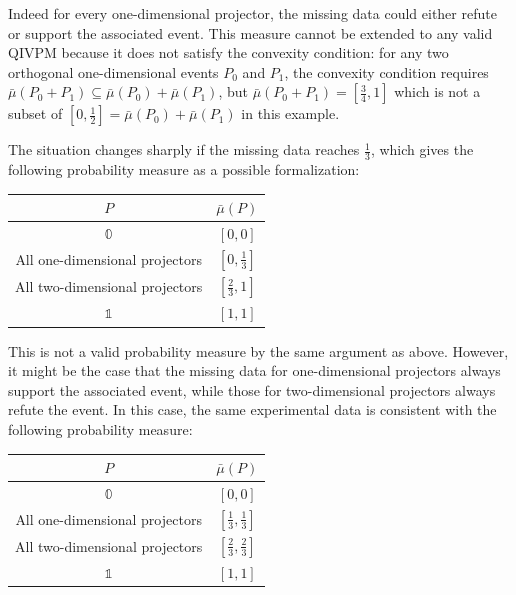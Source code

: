 \documentclass[english,reprint, aps, prl,superscriptaddress, showpacs,
showkeys, longbibliography, amsmath, amssymb, floatfix]{revtex4-1}
\theoremstyle{plain}
\theoremstyle{definition}
\newcommand{\imposs}{\ensuremath{\left[0,0\right]}}
\newcommand{\necess}{\ensuremath{\left[1,1\right]}}
\begin{document}
\noindent Indeed for every one-dimensional projector, the missing
data could either refute or support the associated event. This measure
cannot be extended to any valid QIVPM because it does not satisfy
the convexity condition: for any two orthogonal one-dimensional events
$P_{0}$ and $P_{1}$, the convexity condition requires $\bar{\mu}\left(P_{0}+P_{1}\right)\subseteq\bar{\mu}\left(P_{0}\right)+\bar{\mu}\left(P_{1}\right)$,
but $\bar{\mu}\left(P_{0}+P_{1}\right)=\left[\tfrac{3}{4},1\right]$
which is not a subset of $\left[0,\tfrac{1}{2}\right]=\bar{\mu}\left(P_{0}\right)+\bar{\mu}\left(P_{1}\right)$
in this example.

The situation changes sharply if the missing data reaches $\frac{1}{3}$,
which gives the following probability measure as a possible formalization:
\begin{center}
\begin{tabular}{cc}
\toprule 
\addlinespace
$P$  & $\bar{\mu}\left(P\right)$\tabularnewline
\midrule
\midrule 
\addlinespace
$\mathbb{0}$ & $\imposs$\tabularnewline
\midrule 
\addlinespace
All one-dimensional projectors & $\left[0,\tfrac{1}{3}\right]$\tabularnewline
\midrule 
\addlinespace
All two-dimensional projectors & $\left[\tfrac{2}{3},1\right]$\tabularnewline
\midrule 
\addlinespace
$\mathbb{1}$ & $\necess$\tabularnewline
\bottomrule
\end{tabular}
\par\end{center}

\noindent This is not a valid probability measure by the same argument
as above. However, it might be the case that the missing data for
one-dimensional projectors always support the associated event, while
those for two-dimensional projectors always refute the event. In this
case, the same experimental data is consistent with the following
probability measure:
\begin{center}
\begin{tabular}{cc}
\toprule 
\addlinespace
$P$  & $\bar{\mu}\left(P\right)$\tabularnewline
\midrule
\midrule 
\addlinespace
$\mathbb{0}$ & $\imposs$\tabularnewline
\midrule 
\addlinespace
All one-dimensional projectors & $\left[\tfrac{1}{3},\tfrac{1}{3}\right]$\tabularnewline
\midrule 
\addlinespace
All two-dimensional projectors & $\left[\tfrac{2}{3},\tfrac{2}{3}\right]$\tabularnewline
\midrule 
\addlinespace
$\mathbb{1}$ & $\necess$\tabularnewline
\bottomrule
\end{tabular}
\par\end{center}
\end{document}

